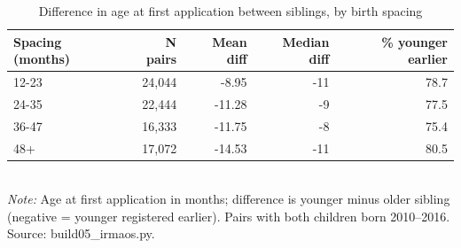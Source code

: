 \begin{table}[htbp]\centering
\caption{Difference in age at first application between siblings, by birth spacing}
\label{tab:S2c_por_espacamento}
\small
\begin{tabular}{lrrrr}
\toprule
Spacing (months) & N pairs & Mean diff & Median diff & \% younger earlier \\
\midrule
12-23 & 24,044 & -8.95 & -11 & 78.7 \\
24-35 & 22,444 & -11.28 & -9 & 77.5 \\
36-47 & 16,333 & -11.75 & -8 & 75.4 \\
48+ & 17,072 & -14.53 & -11 & 80.5 \\
\bottomrule
\end{tabular}
\\[3pt]{\footnotesize \textit{Note:} Age at first application in months; difference is younger minus older sibling (negative = younger registered earlier). Pairs with both children born 2010--2016. Source: build05\_irmaos.py.}
\end{table}
